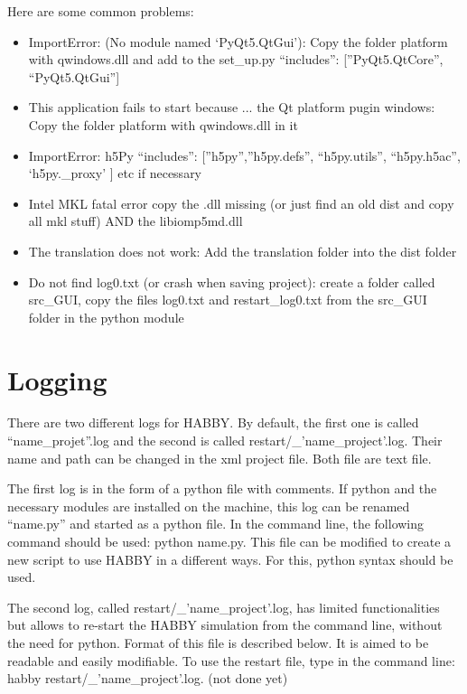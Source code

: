 \documentclass[letterpaper,10pt,english]{sphinxmanual}
\begin{document}
Here are some common problems:
\begin{itemize}
\item {} 
ImportError: (No module named `PyQt5.QtGui'): Copy the folder platform with qwindows.dll and add to the set\_up.py  ``includes'': {[}''PyQt5.QtCore'', ``PyQt5.QtGui''{]}

\item {} 
This application fails to start because ... the Qt platform pugin windows: Copy the folder platform with qwindows.dll in it

\item {} 
ImportError: h5Py ``includes'': {[}''h5py'',''h5py.defs'', ``h5py.utils'', ``h5py.h5ac'', `h5py.\_proxy' {]} etc if necessary

\item {} 
Intel MKL fatal error copy the .dll missing (or just find an old dist and copy all mkl stuff) AND the libiomp5md.dll

\item {} 
The translation does not work: Add the translation folder into the dist folder

\item {} 
Do not find log0.txt (or crash when saving project): create a folder called src\_GUI, copy the files log0.txt and restart\_log0.txt from the src\_GUI folder in the python module

\end{itemize}


\section{Logging}
\label{\detokenize{index:logging}}

There are two different logs for HABBY. By default, the first one is called “name\_projet”.log and
the second is called restart/\_'name\_project'.log. Their name and path can be changed in the xml
project file. Both file are text file.

The first log is in the form of a python file with comments. If python and the necessary modules
are installed on the machine, this log can be renamed “name.py” and started as a python file.
In the command line, the following command should be used: python name.py. This file can be
modified to create a new script to use HABBY in a different ways. For this, python syntax should be used.

The second log, called restart/\_’name\_project’.log, has limited functionalities but allows to
re-start the HABBY simulation from the command line, without the need for python.
Format of this file is described below. It is aimed to be readable and easily modifiable.
To use the restart file, type in the command line: habby restart/\_’name\_project’.log. (not done yet)
\end{document}
